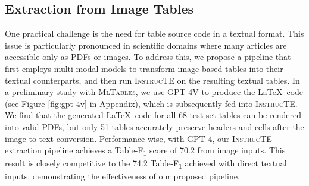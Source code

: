 \documentclass[11pt]{article}
\newcommand\method{\textsc{InstrucTE}}
\newcommand\data{\textsc{MlTables}}
\begin{document}
\begin{table}[!t]
\centering
{}
\caption{
    Experimental results for knowledge distillation. Student models are trained on the synthetic data generated by the teacher, and evaluated on \textsc{Test} set of \data{}. \texttt{GPU hours} refers to the training time ($\times$ number of GPUs) of student models for one epoch. 
}
\label{tab:distillation}
\end{table}

\subsection{Extraction from Image Tables}
One practical challenge is the need for table source code in a textual format. This issue is particularly pronounced in scientific domains where many articles are accessible only as PDFs or images. To address this, we propose a pipeline that first employs multi-modal models to transform image-based tables into their textual counterparts, and then run \textsc{InstrucTE} on the resulting textual tables. 
In a preliminary study with \data{}, we use GPT-4V to produce the \LaTeX~code (see Figure \ref{fig:gpt-4v} in Appendix), which is subsequently fed into \textsc{InstrucTE}. 
We find that the generated \LaTeX~code for all 68 test set tables can be rendered into valid PDFs, but only 51 tables accurately preserve headers and cells after the image-to-text conversion.
Performance-wise, with GPT-4, our \method{} extraction pipeline achieves a Table-F\textsubscript{1} score of 70.2 from image inputs. This result is closely competitive to the 74.2 Table-F\textsubscript{1} achieved with direct textual inputs, demonstrating the effectiveness of our proposed pipeline.  
\end{document}
